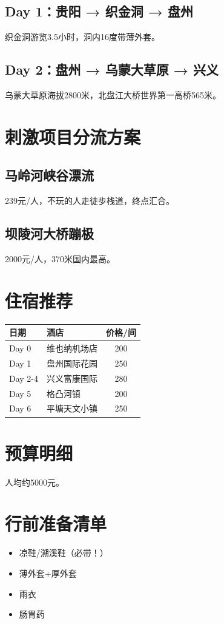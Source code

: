 \documentclass[12pt,a4paper,UTF8]{ctexart}
\begin{document}
\subsection{Day 1：贵阳 → 织金洞 → 盘州}
织金洞游览3.5小时，洞内16度带薄外套。

\subsection{Day 2：盘州 → 乌蒙大草原 → 兴义}
乌蒙大草原海拔2800米，北盘江大桥世界第一高桥565米。

\section{刺激项目分流方案}
\subsection{马岭河峡谷漂流}
239元/人，不玩的人走徒步栈道，终点汇合。

\subsection{坝陵河大桥蹦极}
2000元/人，370米国内最高。

\section{住宿推荐}
\begin{table}[h]
\centering
\begin{tabular}{llc}
\toprule
日期 & 酒店 & 价格/间 \\
\midrule
Day 0 & 维也纳机场店 & 200 \\
Day 1 & 盘州国际花园 & 250 \\
Day 2-4 & 兴义富康国际 & 280 \\
Day 5 & 格凸河镇 & 200 \\
Day 6 & 平塘天文小镇 & 250 \\
\bottomrule
\end{tabular}
\end{table}

\section{预算明细}
人均约5000元。

\section{行前准备清单}
\begin{itemize}
\item 凉鞋/溯溪鞋（必带！）
\item 薄外套+厚外套
\item 雨衣
\item 肠胃药
\end{itemize}
\end{document}
